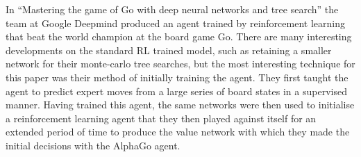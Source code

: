 In ``Mastering the game of Go with deep neural networks and tree search''\cite{alphaGo} the team at Google Deepmind produced an agent trained by reinforcement learning that beat the world champion at the board game Go. There are many interesting developments on the standard RL trained model, such as retaining a smaller network for their monte-carlo tree searches, but the most interesting technique for this paper was their method of initially training the agent. They first taught the agent to predict expert moves from a large series of board states in a supervised manner. Having trained this agent, the same networks were then used to initialise a reinforcement learning agent that they then played against itself for an extended period of time to produce the value network with which they made the initial decisions with the AlphaGo agent. 

